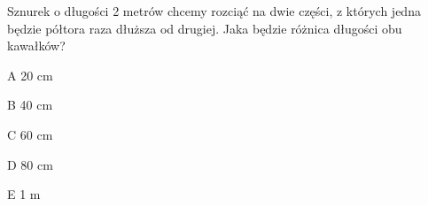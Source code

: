 \begin{tresc}
Sznurek o długości 2 metrów chcemy rozciąć na dwie części, z których jedna będzie półtora raza dłuższa od drugiej. Jaka będzie różnica długości obu kawałków?
\end{tresc}
\begin{wariant}{A} 20 cm \end{wariant}
\begin{wariant}{B} 40 cm \end{wariant}
\begin{wariant}{C} 60 cm \end{wariant}
\begin{wariant}{D} 80 cm \end{wariant}
\begin{wariant}{E} 1 m \end{wariant}
